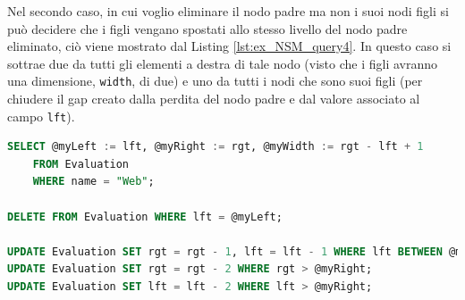 %
Nel secondo caso, in cui voglio eliminare il nodo padre ma non i suoi nodi figli si può decidere che i figli vengano spostati allo stesso livello del 
nodo padre eliminato, ciò viene mostrato dal Listing \ref{lst:ex_NSM_query4}. In questo caso si sottrae due da tutti gli elementi a destra di tale nodo 
(visto che i figli avranno una dimensione, \texttt{width}, di due) e uno da tutti i nodi che sono suoi figli (per chiudere il gap creato dalla perdita 
del nodo padre e dal valore associato al campo \texttt{lft}).
\begin{lstlisting}[language=SQL, label=lst:ex_NSM_query4, caption={Query in puro Sql per eliminare un nodo padre dalla tassonomia delle Evaluation, 
    secondo il Nested Set Model.}]
SELECT @myLeft := lft, @myRight := rgt, @myWidth := rgt - lft + 1
    FROM Evaluation
    WHERE name = "Web";

DELETE FROM Evaluation WHERE lft = @myLeft;

UPDATE Evaluation SET rgt = rgt - 1, lft = lft - 1 WHERE lft BETWEEN @myLeft AND @myRight;
UPDATE Evaluation SET rgt = rgt - 2 WHERE rgt > @myRight;
UPDATE Evaluation SET lft = lft - 2 WHERE lft > @myRight;
\end{lstlisting}
%

